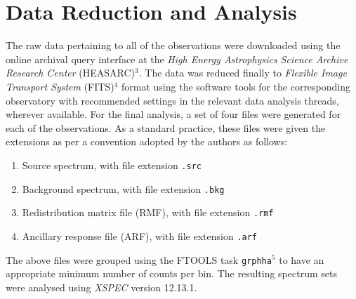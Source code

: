 \section{Data Reduction and Analysis} \label{sec:reduction-analysis}
    The raw data pertaining to all of the observations were downloaded using the online archival query interface at the \textit{High Energy Astrophysics Science Archive Research Center} (HEASARC)$^3$. The data was reduced finally to \textit{Flexible Image Transport System} (FITS)$^4$ format using the software tools for the corresponding observatory with recommended settings in the relevant data analysis threads, wherever available. For the final analysis, a set of four files were generated for each of the observations. As a standard practice, these files were given the extensions as per a convention adopted by the authors as follows:
    \begin{enumerate}
    	\item Source spectrum, with file extension \texttt{.src}
    	\item Background spectrum, with file extension \texttt{.bkg}
    	\item Redistribution matrix file (RMF), with file extension \texttt{.rmf}
    	\item Ancillary response file (ARF), with file extension \texttt{.arf}
    \end{enumerate}
    The above files were grouped using the FTOOLS task \texttt{grphha}$^{5}$ to have an appropriate minimum number of counts per bin. The resulting spectrum sets were analysed using \textit{XSPEC} version 12.13.1.
    
